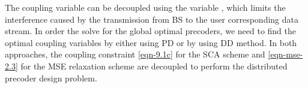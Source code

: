 The coupling variable  can be decoupled using the variable , which limits the interference caused by the transmission from \ac{BS}  to the user  corresponding data stream. In order the solve for the global optimal precoders, we need to find the optimal coupling variables  by either using \ac{PD} or by using \ac{DD} method. In both approaches, the coupling constraint \eqref{eqn-9.1c} for the \ac{SCA} scheme and \eqref{eqn-mse-2.3} for the \ac{MSE} relaxation scheme are decoupled to perform the distributed precoder design problem.